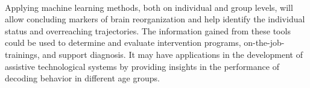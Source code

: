 \\
Applying machine learning methods, both on individual and group levels, will allow concluding markers of brain reorganization and help identify the individual status and overreaching trajectories. The information gained from these tools could be used to determine and evaluate intervention programs, on-the-job-trainings, and support diagnosis. It may have applications in the development of assistive technological systems by providing insights in the performance of decoding behavior in different age groups. 
